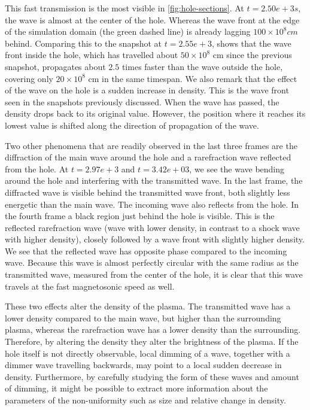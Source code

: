 This fast transmission is the most visible in \cref{fig:hole-sections}. 
At $t=2.50e+3 s$, the wave is almost at the center of the hole. Whereas the wave front at the edge of the simulation domain (the green dashed line) is already lagging $100\times10^{8} cm$ behind.
Comparing this to the snapshot at $t=2.55e+3$, shows that the wave front inside the hole, which has travelled about $50\times10^{8}$ cm since the previous snapshot, propagates about $2.5$ times faster than the wave outside the hole, covering only $20\times10^{8}$ cm in the same timespan.
We also remark that the effect of the wave on the hole is a sudden increase in density. This is the wave front seen in the snapshots previously discussed.
When the wave has passed, the density drops back to its original value. However, the position where it reaches its lowest value is shifted along the direction of propagation of the wave.

Two other phenomena that are readily observed in the last three frames are the diffraction of the main wave around the hole and a rarefraction wave reflected from the hole.
At $t=2.97e+3$ and $t=3.42e+03$, we see the wave bending around the hole and interfering with the transmitted wave.
In the last frame, the diffracted wave is visible behind the transmitted wave front, both slightly less energetic than the main wave.
The incoming wave also reflects from the hole.
In the fourth frame a black region just behind the hole is visible. This is the reflected rarefraction wave (wave with lower density, in contrast to a shock wave with higher density), closely followed by a wave front with slightly higher density.
We see that the reflected wave has opposite phase compared to the incoming wave.
Because this wave is almost perfectly circular with the same radius as the transmitted wave, measured from the center of the hole, it is clear that this wave travels at the fast magnetosonic speed as well.

These two effects alter the density of the plasma. The transmitted wave has a lower density compared to the main wave, but higher than the surrounding plasma, whereas the rarefraction wave has a lower density than the surrounding.
Therefore, by altering the density they alter the brightness of the plasma. 
If the hole itself is not directly observable, local dimming of a wave, together with a dimmer wave travelling backwards, may point to a local sudden decrease in density.
Furthermore, by carefully studying the form of these waves and amount of dimming, it might be possible to extract more information about the parameters of the non-uniformity such as size and relative change in density.

